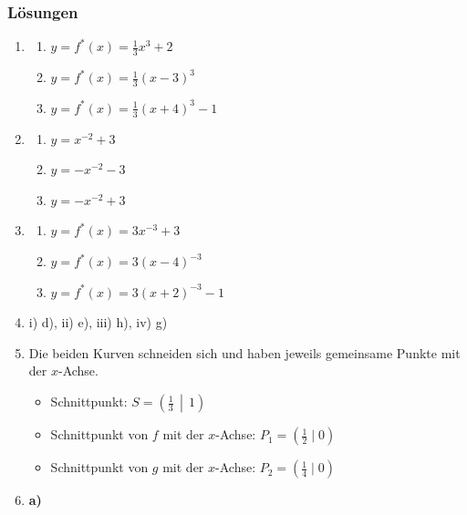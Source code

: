 \subsubsection*{Lösungen}
\begin{enumerate}
    \item \begin{enumerate}
              \item $y = f^*(x) = \frac{1}{3}x^3 + 2$
              \item $y = f^*(x) = \frac{1}{3}(x-3)^3$
              \item $y = f^*(x) = \frac{1}{3}(x+4)^3 - 1$
          \end{enumerate}
    \item \begin{enumerate}
              \item $y = x^{-2} + 3$
              \item $y = -x^{-2} - 3$
              \item $y = -x^{-2} + 3$
          \end{enumerate}
    \item \begin{enumerate}
              \item $y = f^*(x) = 3x^{-3} + 3$
              \item $y = f^*(x) = 3(x-4)^{-3}$
              \item $y = f^*(x) = 3(x+2)^{-3} - 1$
          \end{enumerate}
    \item i) d), ii) e), iii) h), iv) g)
    \item Die beiden Kurven schneiden sich und haben jeweils gemeinsame Punkte mit der $x$-Achse.
          \begin{itemize}
              \item Schnittpunkt: $S=\left(\frac{1}{3}\,\middle|\,1\right)$
              \item Schnittpunkt von $f$ mit der $x$-Achse: $P_1=(\frac{1}{2}\mid 0)$
              \item Schnittpunkt von $g$ mit der $x$-Achse: $P_2=(\frac{1}{4}\mid 0)$
          \end{itemize}
    \item
          \begin{minipage}[t]{0.32\textwidth}
              \centering
              \textbf{a)}


\end{minipage}
\end{enumerate}
